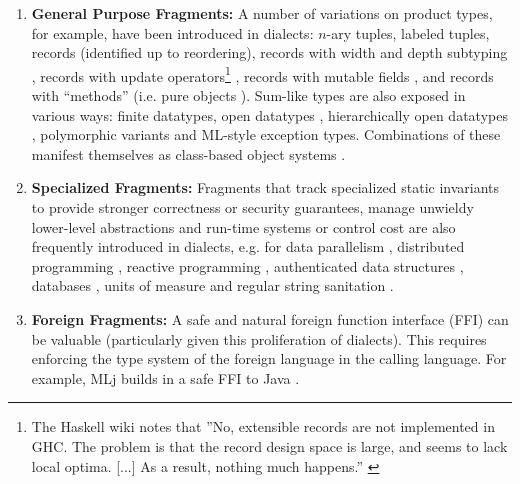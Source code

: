 \documentclass[10pt,preprint]{sigplanconf}
\begin{document}
\begin{enumerate}
\vspace{-5px}
\item 
\textbf{General Purpose Fragments:} 
A number of variations on product types, for example, have been introduced in dialects: 
$n$-ary tuples, 
labeled tuples, 
records (identified up to reordering), 
records with width and depth subtyping \cite{Cardelli:1984:SMI:1096.1098}, 
records with update operators\footnote{The Haskell wiki notes that ''No, extensible records are not implemented in GHC. The problem is that the record design space is large, and seems to lack local optima. [...] As a result, nothing much happens.'' \cite{GHCFAQ}} \cite{ocaml-manual}, 
records with mutable fields \cite{ocaml-manual}, 
and 
records with ``methods'' (i.e. pure objects \cite{TSLs}). 
 Sum-like types are also exposed in various ways: 
finite datatypes, 
open datatypes \cite{conf/ppdp/LohH06}, 
hierarchically open datatypes \cite{journals/toplas/MillsteinBC04}, 
polymorphic variants \cite{ocaml-manual} and 
ML-style exception types. Combinations of these manifest themselves as class-based object systems \cite{ocaml-manual}. 

\item
\textbf{Specialized Fragments:} Fragments that track specialized static invariants to provide stronger correctness or security guarantees, manage unwieldy lower-level abstractions and run-time systems or control cost are also frequently introduced in dialects, e.g. for data parallelism  \cite{chakravarty2007data}, distributed programming \cite{Murphy:2007:TDP:1793574.1793585}, reactive programming \cite{mandel2005reactiveml}, authenticated data structures \cite{Miller:2014:ADS:2535838.2535851}, databases \cite{Ohori:2011:MSM:2034773.2034815},  units of measure \cite{conf/cefp/Kennedy09} and regular string sanitation \cite{sanitation-psp14}. %

\item
\textbf{Foreign Fragments:} A safe and natural foreign function interface (FFI) can be valuable (particularly given this proliferation of dialects). This requires enforcing the type system of the foreign language in the calling language. %
For example, MLj builds in a safe FFI to Java \cite{Benton:1999:IWW:317636.317791}.
\end{enumerate}
\vspace{-5px}
\end{document}
